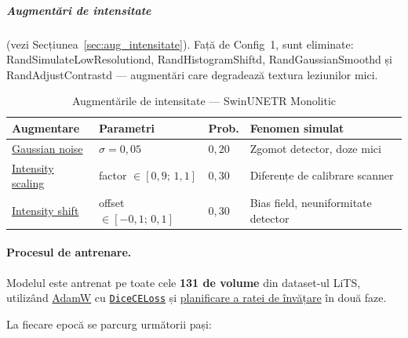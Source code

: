 \documentclass[12pt, a4paper]{report}
\begin{document}
\subparagraph{Augmentări de intensitate}
(vezi Secțiunea~\ref{sec:aug_intensitate}).
Față de Config~1, sunt eliminate:
RandSimulateLowResolutiond,
RandHistogramShiftd,
RandGaussianSmoothd și
RandAdjustContrastd — augmentări care degradează
textura leziunilor mici.

\begin{table}[H]
    \centering
    \caption{Augmentările de intensitate — SwinUNETR Monolitic}
    \label{tab:aug_mono}
    \begin{tabular}{llll}
        \toprule
        \textbf{Augmentare} & \textbf{Parametri} &
        \textbf{Prob.} & \textbf{Fenomen simulat} \\
        \midrule
        \hyperref[sec:gaussnoise]{Gaussian noise}
            & $\sigma = 0{,}05$
            & $0{,}20$
            & Zgomot detector, doze mici \\
        \hyperref[sec:scaleintensity]{Intensity scaling}
            & factor $\in [0{,}9;\,1{,}1]$
            & $0{,}30$
            & Diferențe de calibrare scanner \\
        \hyperref[sec:shiftintensity]{Intensity shift}
            & offset $\in [-0{,}1;\,0{,}1]$
            & $0{,}30$
            & Bias field, neuniformitate detector \\
        \bottomrule
    \end{tabular}
\end{table}

\paragraph{Procesul de antrenare.}
Modelul este antrenat pe toate cele \textbf{131 de volume}
din dataset-ul LiTS, utilizând
\hyperref[sec:adamw]{AdamW} cu
\hyperref[sec:diceceloss]{\texttt{DiceCELoss}} și
\hyperref[sec:lr_scheduling]{planificare a ratei de învățare}
în două faze.

La fiecare epocă se parcurg următorii pași:
\end{document}
